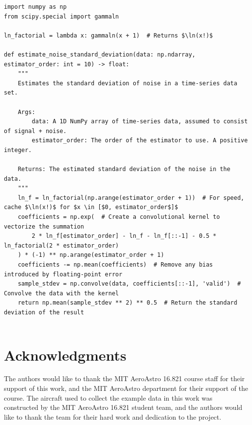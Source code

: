 \documentclass[conf]{new-aiaa}
\begin{document}
    \begin{listing}[H]
        \begin{verbatim}
import numpy as np
from scipy.special import gammaln

ln_factorial = lambda x: gammaln(x + 1)  # Returns $\ln(x!)$

def estimate_noise_standard_deviation(data: np.ndarray, estimator_order: int = 10) -> float:
    """
    Estimates the standard deviation of noise in a time-series data set.

    Args:
        data: A 1D NumPy array of time-series data, assumed to consist of signal + noise.
        estimator_order: The order of the estimator to use. A positive integer.

    Returns: The estimated standard deviation of the noise in the data.
    """
    ln_f = ln_factorial(np.arange(estimator_order + 1))  # For speed, cache $\ln(x!)$ for $x \in [$0, estimator_order$]$
    coefficients = np.exp(  # Create a convolutional kernel to vectorize the summation
        2 * ln_f[estimator_order] - ln_f - ln_f[::-1] - 0.5 * ln_factorial(2 * estimator_order)
    ) * (-1) ** np.arange(estimator_order + 1)
    coefficients -= np.mean(coefficients)  # Remove any bias introduced by floating-point error
    sample_stdev = np.convolve(data, coefficients[::-1], 'valid')  # Convolve the data with the kernel
    return np.mean(sample_stdev ** 2) ** 0.5  # Return the standard deviation of the result


        \end{verbatim}
        \caption{Example efficient implementation of the arbitrary-order noise estimator using NumPy/SciPy in Python 3.}
        \label{listing:efficient_arbitrary_order_noise_estimator}
    \end{listing}

    \section*{Acknowledgments}
    The authors would like to thank the MIT AeroAstro 16.821 course staff for their support of this work, and the MIT AeroAstro department for their support of the course. The aircraft used to collect the example data in this work was constructed by the MIT AeroAstro 16.821 student team, and the authors would like to thank the team for their hard work and dedication to the project.

    
\end{document}
